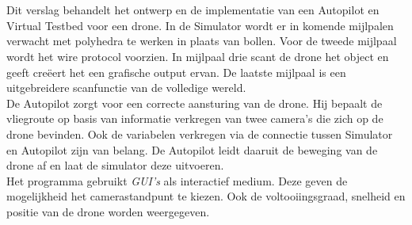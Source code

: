 \\\\
Dit verslag behandelt het ontwerp en de implementatie van een Autopilot en Virtual Testbed voor een drone. In de Simulator wordt er in komende mijlpalen verwacht met polyhedra te werken in plaats van bollen. Voor de tweede mijlpaal wordt het wire protocol voorzien. In mijlpaal drie scant de drone het object en geeft cre\"eert het een grafische output ervan. De laatste mijlpaal is een uitgebreidere scanfunctie van de volledige wereld. 
\\
De Autopilot zorgt voor een correcte aansturing van de drone. Hij bepaalt de vliegroute op basis van informatie verkregen van twee camera's die zich op de drone bevinden. Ook de variabelen verkregen via de connectie tussen Simulator en Autopilot zijn van belang. De Autopilot leidt daaruit de beweging van de drone af en laat de simulator deze uitvoeren.
\\
Het programma gebruikt \textit{GUI's} als interactief medium. Deze geven de mogelijkheid het camerastandpunt te kiezen. Ook de voltooiingsgraad, snelheid en positie van de drone worden weergegeven.